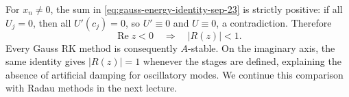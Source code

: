 For \(x_n\neq0\), the sum in
\eqref{eq:gauss-energy-identity-sep-23} is strictly positive: if all
\(U_j=0\), then all \(U'(c_j)=0\), so \(U'\equiv0\) and
\(U\equiv0\), a contradiction. Therefore
\[
 \operatorname{Re}z<0\quad\Longrightarrow\quad |R(z)|<1.
\]
Every Gauss RK method is consequently \(A\)-stable. On the
imaginary axis, the same identity gives \(|R(z)|=1\) whenever the
stages are defined, explaining the absence of artificial damping for
oscillatory modes. We continue this comparison with Radau methods
in the next lecture.
